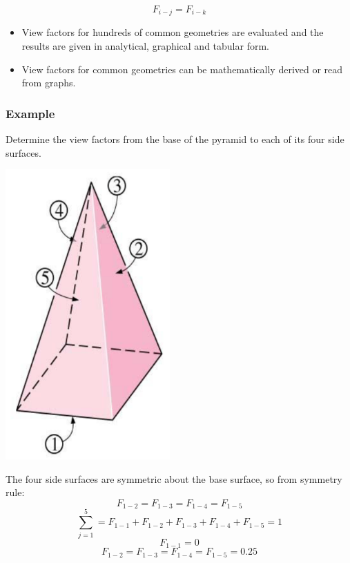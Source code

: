 \documentclass[11pt]{article}
\begin{document}
\[F_{i-j} = F_{i-k}\]

\begin{itemize}
\item View factors for hundreds of common geometries are evaluated and the results are given in analytical, graphical and tabular form.
\item View factors for common geometries can be mathematically derived or read from graphs.
\end{itemize}

 \newpage
\subsubsection{Example}
\label{sec:org7df0d49}
Determine the view factors from the base of the pyramid to each of its four side surfaces.
\begin{center}
\includegraphics[height=30em]{./images/symmetry-rule-example-diagram.png}
\end{center}

The four side surfaces are symmetric about the base surface, so from symmetry rule:
\[F_{1-2} = F_{1-3} = F_{1-4} = F_{1-5}\]
\[\sum_{j=1}^5 = F_{1-1} + F_{1-2} + F_{1-3} + F_{1-4} + F_{1-5} = 1\]
\[F_{1-1} = 0\]
\[F_{1-2} = F_{1-3} = F_{1-4} = F_{1-5} = 0.25\]
\end{document}
